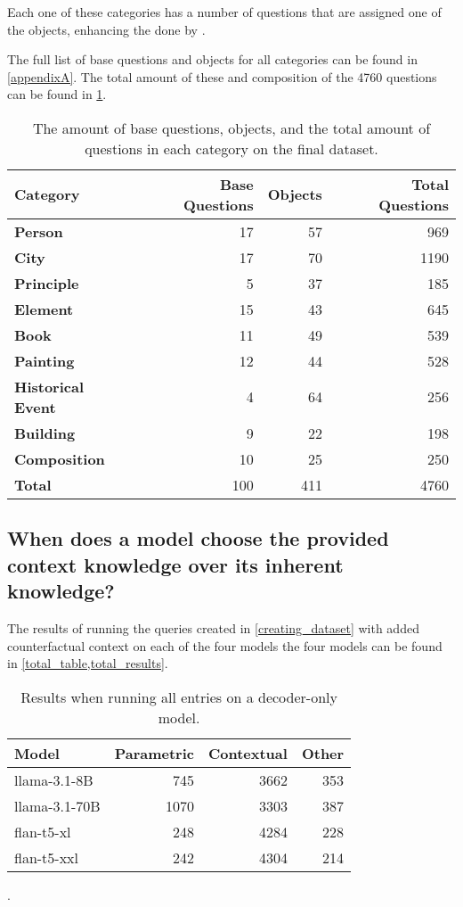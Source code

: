 Each one of these categories has a number of questions that are assigned one of the objects, enhancing the done by \citeauthor{factual_recall}.

The full list of base questions and objects for all categories can be found in \cref{appendixA}.
The total amount of these and composition of the 4760 questions can be found in \cref{category_amounts}.

\begin{table}[h]
	\centering
	\scriptsize
	\begin{tabular}{>{\bfseries}l r r r}
		\toprule
			\bfseries Category & \bfseries Base Questions & \bfseries Objects & \bfseries Total Questions \\
		\midrule
			Person           &  17 &  57 &  969 \\
			City             &  17 &  70 & 1190 \\
			Principle        &   5 &  37 &  185 \\
			Element          &  15 &  43 &  645 \\
			Book             &  11 &  49 &  539 \\
			Painting         &  12 &  44 &  528 \\
			Historical Event &   4 &  64 &  256 \\
			Building         &   9 &  22 &  198 \\
			Composition      &  10 &  25 &  250 \\
		\midrule
			Total            & 100 & 411 & 4760 \\
		\bottomrule
	\end{tabular}
	\caption{The amount of base questions, objects, and the total amount of questions in each category on the final dataset.}
	\label{category_amounts}
\end{table}

\newpage{}

\subsection{When does a model choose the provided context knowledge over its inherent knowledge?}

The results of running the queries created in \cref{creating_dataset} with added counterfactual context on each of the four models the four models can be found in \cref{total_table,total_results}.

\begin{table}[htbp]
	\centering
	\footnotesize
	\begin{tabular}{l r r r}
		\toprule
			\bfseries Model & \bfseries Parametric & \bfseries Contextual & \bfseries Other \\
		\midrule
			\ttfamily llama-3.1-8B & 745 & 3662 & 353 \\
			\ttfamily llama-3.1-70B & 1070 & 3303 & 387 \\
		\midrule
			\ttfamily flan-t5-xl  & 248 & 4284 & 228 \\
			\ttfamily flan-t5-xxl & 242 & 4304 & 214 \\
		\bottomrule
	\end{tabular}
	\caption{Results when running all entries on a decoder-only model.}
	\label{total_table}.
\end{table}

